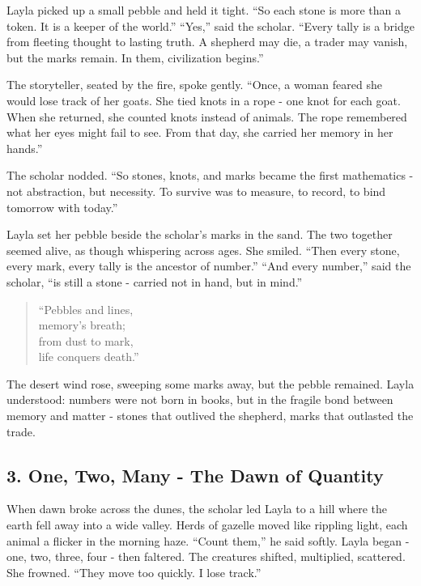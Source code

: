 \documentclass[
  letterpaper,
  DIV=11,
  numbers=noendperiod]{scrreprt}
\begin{document}
Layla picked up a small pebble and held it tight. ``So each stone is
more than a token. It is a keeper of the world.'' ``Yes,'' said the
scholar. ``Every tally is a bridge from fleeting thought to lasting
truth. A shepherd may die, a trader may vanish, but the marks remain. In
them, civilization begins.''

The storyteller, seated by the fire, spoke gently. ``Once, a woman
feared she would lose track of her goats. She tied knots in a rope - one
knot for each goat. When she returned, she counted knots instead of
animals. The rope remembered what her eyes might fail to see. From that
day, she carried her memory in her hands.''

The scholar nodded. ``So stones, knots, and marks became the first
mathematics - not abstraction, but necessity. To survive was to measure,
to record, to bind tomorrow with today.''

Layla set her pebble beside the scholar's marks in the sand. The two
together seemed alive, as though whispering across ages. She smiled.
``Then every stone, every mark, every tally is the ancestor of number.''
``And every number,'' said the scholar, ``is still a stone - carried not
in hand, but in mind.''

\begin{quote}
``Pebbles and lines,\\
memory's breath;\\
from dust to mark,\\
life conquers death.''
\end{quote}

The desert wind rose, sweeping some marks away, but the pebble remained.
Layla understood: numbers were not born in books, but in the fragile
bond between memory and matter - stones that outlived the shepherd,
marks that outlasted the trade.

\subsection{3. One, Two, Many - The Dawn of
Quantity}\label{one-two-many---the-dawn-of-quantity}

When dawn broke across the dunes, the scholar led Layla to a hill where
the earth fell away into a wide valley. Herds of gazelle moved like
rippling light, each animal a flicker in the morning haze. ``Count
them,'' he said softly. Layla began - one, two, three, four - then
faltered. The creatures shifted, multiplied, scattered. She frowned.
``They move too quickly. I lose track.''
\end{document}
